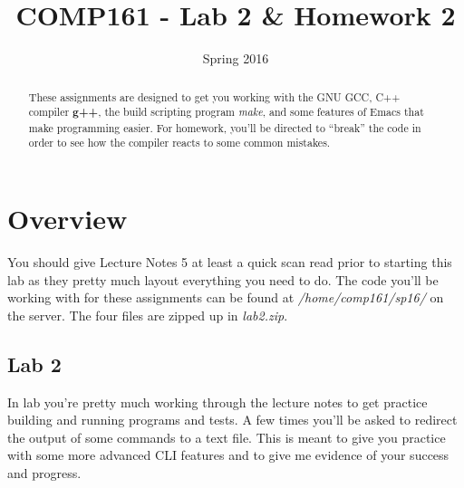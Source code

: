 \documentclass[]{tufte-handout}
\title{COMP161 - Lab 2 \& Homework 2}
\author{}
\date{Spring 2016}
\begin{document}
\maketitle

\begin{abstract}
These assignments are designed to get you working with the GNU GCC, C++ compiler \textbf{g++}, the build scripting program \textit{make}, and some features of Emacs that make programming easier. For homework, you'll be directed to ``break'' the code in order to see how the compiler reacts to some common mistakes. 
\end{abstract}

\section{Overview}

You should give Lecture Notes 5 at least a quick scan read prior to starting this lab as they pretty much layout everything you need to do. The code you'll be working with for these assignments can be found at \textit{/home/comp161/sp16/} on the server. The four files are zipped up in \textit{lab2.zip}.

\subsection{Lab 2}

In lab you're pretty much working through the lecture notes to get practice building and running programs and tests.  A few times you'll be asked to redirect the output of some commands to a text file.  This is meant to give you practice with some more advanced CLI features and to give me evidence of your success and progress. 
\end{document}
